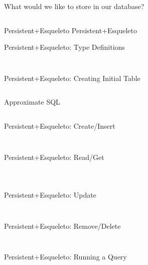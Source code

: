 \documentclass[hyperref={pdfpagelabels=false},12pt]{beamer}
\newcommand{\pygment}[3]{
  \inputminted[frame=single,framesep=2mm,linenos,fontsize=#1]{#2}{#3}
}
\newcommand{\pygmentLines}[5]{
  \inputminted[frame=single,framesep=2mm,linenos,fontsize=#1,firstline=#2,lastline=#3,autogobble]{#4}{#5}
}
\begin{document}
\begin{frame}{What would we like to store in our database?}
  \pygment{\tiny}{haskell}{code/Person.hs}
\end{frame}

\begin{frame}{Persistent+Esqueleto}
  \centering \Huge Persistent+Esqueleto
\end{frame}

\begin{frame}{Persistent+Esqueleto: Type Definitions}
  \pygmentLines{\scriptsize}{18}{18}{haskell}{code/pers-esql/src/Person.hs}
  \pygmentLines{\scriptsize}{20}{37}{haskell}{code/pers-esql/src/Person.hs}
\end{frame}

\begin{frame}{Persistent+Esqueleto: Creating Initial Table}
  \pygmentLines{\scriptsize}{48}{49}{haskell}{code/pers-esql/src/Person.hs}
  \begin{center}
    Approximate SQL
  \end{center}
  \pygment{\scriptsize}{sql}{code/sql/createTable.sql}
\end{frame}

\begin{frame}{Persistent+Esqueleto: Create/Insert}
  \pygmentLines{\scriptsize}{51}{57}{haskell}{code/pers-esql/src/Person.hs}
  \pygment{\scriptsize}{sql}{code/sql/insertInto.sql}
\end{frame}

\begin{frame}{Persistent+Esqueleto: Read/Get}
  \pygmentLines{\scriptsize}{15}{15}{haskell}{code/pers-esql/src/Person.hs}
  \pygmentLines{\scriptsize}{59}{67}{haskell}{code/pers-esql/src/Person.hs}
  \pygment{\scriptsize}{sql}{code/sql/selectWhere.sql}
\end{frame}

\begin{frame}{Persistent+Esqueleto: Update}
  \pygmentLines{\scriptsize}{69}{77}{haskell}{code/pers-esql/src/Person.hs}
  \pygment{\scriptsize}{sql}{code/sql/updateSetWhere.sql}
\end{frame}

\begin{frame}{Persistent+Esqueleto: Remove/Delete}
  \pygmentLines{\scriptsize}{79}{87}{haskell}{code/pers-esql/src/Person.hs}
  \pygment{\scriptsize}{sql}{code/sql/deleteWhere.sql}
\end{frame}

\begin{frame}{Persistent+Esqueleto: Running a Query}
  \pygmentLines{\scriptsize}{28}{31}{haskell}{code/pers-esql/test/Spec.hs}
  \pygmentLines{\scriptsize}{40}{45}{haskell}{code/pers-esql/test/Spec.hs}
\end{frame}
\end{document}

